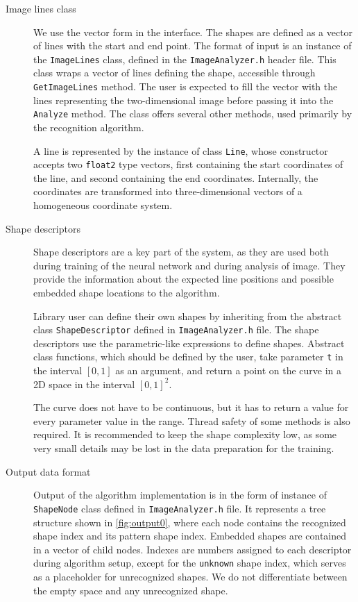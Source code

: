 \begin{description}
\item [Image lines class]
We use the vector form in the interface. The shapes are defined as a vector of lines with the start and end point.
The format of input is an instance of the \texttt{ImageLines} class, defined in the \texttt{ImageAnalyzer.h} header file. This class wraps a vector of lines defining the shape, accessible through \texttt{GetImageLines} method. The user is expected to fill the vector with the lines representing the two-dimensional image before passing it into the \texttt{Analyze} method. The class offers several other methods, used primarily by the recognition algorithm. 

A line is represented by the instance of class \texttt{Line}, whose constructor accepts two \texttt{float2} type vectors, first containing the start coordinates of the line, and second containing the end coordinates. Internally, the coordinates are transformed into three-dimensional vectors of a homogeneous coordinate system. 

\item [Shape descriptors]
Shape descriptors are a key part of the system, as they are used both during training of the neural network and during analysis of image. They provide the information about the expected line positions and possible embedded shape locations to the algorithm.

Library user can define their own shapes by inheriting from the abstract class \texttt{ShapeDescriptor} defined in \texttt{ImageAnalyzer.h} file. The shape descriptors use the parametric-like expressions to define shapes. Abstract class functions, which should be defined by the user, take parameter \texttt{t} in the interval $[0,1]$ as an argument, and return a point on the curve in a 2D space in the interval $[0,1]^2$.

The curve does not have to be continuous, but it has to return a value for every parameter value in the range. Thread safety of some methods is also required. It is recommended to keep the shape complexity low, as some very small details may be lost in the data preparation for the training.

\item [Output data format]
Output of the algorithm implementation is in the form of instance of \texttt{ShapeNode} class defined in \texttt{ImageAnalyzer.h} file. It represents a tree structure shown in \cref{fig:output0}, where each node contains the recognized shape index and its pattern shape index. Embedded shapes are contained in a vector of child nodes. Indexes are numbers assigned to each descriptor during algorithm setup, except for the \texttt{unknown} shape index, which serves as a placeholder for unrecognized shapes. We do not differentiate between the empty space and any unrecognized shape.


\end{description}
